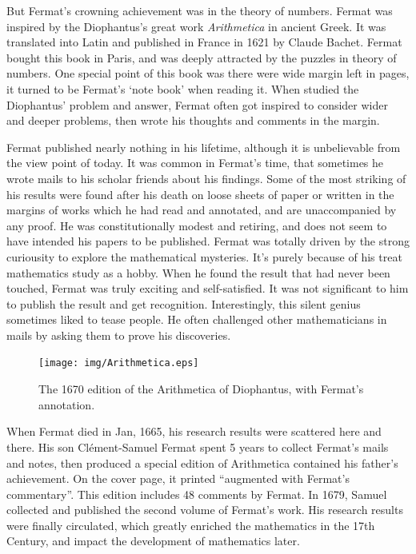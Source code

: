 \documentclass{article}
\begin{document}
But Fermat's crowning achievement was in the theory of numbers. Fermat was inspired by the Diophantus's great work {\em Arithmetica} in ancient Greek. It was translated into Latin and published in France in 1621 by Claude Bachet. Fermat bought this book in Paris, and was deeply attracted by the puzzles in theory of numbers. One special point of this book was there were wide margin left in pages, it turned to be Fermat's `note book' when reading it. When studied the Diophantus' problem and answer, Fermat often got inspired to consider wider and deeper problems, then wrote his thoughts and comments in the margin.

Fermat published nearly nothing in his lifetime, although it is unbelievable from the view point of today. It was common in Fermat's time, that sometimes he wrote mails to his scholar friends about his findings. Some of the most striking of his results were found after his death on loose sheets of paper or written in the margins of works which he had read and annotated, and are unaccompanied by any proof. He was constitutionally modest and retiring, and does not seem to have intended his papers to be published. Fermat was totally driven by the strong curiousity to explore the mathematical mysteries. It's purely because of his treat mathematics study as a hobby. When he found the result that had never been touched, Fermat was truly exciting and self-satisfied. It was not significant to him to publish the result and get recognition\cite{HanXueTao2009}. Interestingly, this silent genius sometimes liked to tease people. He often challenged other mathematicians in mails by asking them to prove his discoveries.

\begin{figure}
 \centering
 \texttt{[image: img/Arithmetica.eps]}
 \captionsetup{labelformat=empty}
 \caption{The 1670 edition of the Arithmetica of Diophantus, with Fermat's annotation.}
 \label{fig:Arithmetica}
\end{figure}

When Fermat died in Jan, 1665, his research results were scattered here and there. His son Clément-Samuel Fermat spent 5 years to collect Fermat's mails and notes, then produced a special edition of Arithmetica contained his father's achievement. On the cover page, it printed ``augmented with Fermat's commentary''. This edition includes 48 comments by Fermat. In 1679, Samuel collected and published the second volume of Fermat's work. His research results were finally circulated, which greatly enriched the mathematics in the 17th Century, and impact the development of mathematics later.
\end{document}
